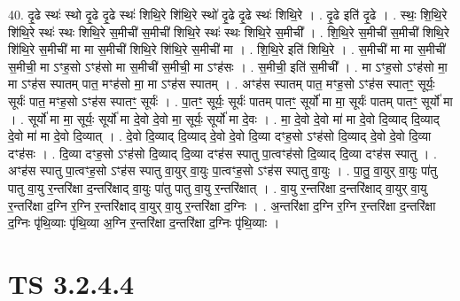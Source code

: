 \documentclass[17pt]{extarticle}
\begin{document}
40. दृ॒ढे स्थः॑ स्थो दृ॒ढे दृ॒ढे स्थः॑ शिथि॒रे शि॑थि॒रे स्थो॑ दृ॒ढे दृ॒ढे स्थः॑ शिथि॒रे । . दृ॒ढे इति॑ दृ॒ढे । . स्थः॒ शि॒थि॒रे शि॑थि॒रे स्थः॑ स्थः शिथि॒रे स॒मीची॑ स॒मीची॑ शिथि॒रे स्थः॑ स्थः शिथि॒रे स॒मीची᳚ । . शि॒थि॒रे स॒मीची॑ स॒मीची॑ शिथि॒रे शि॑थि॒रे स॒मीची॑ मा मा स॒मीची॑ शिथि॒रे शि॑थि॒रे स॒मीची॑ मा । . शि॒थि॒रे इति॑ शिथि॒रे । . स॒मीची॑ मा मा स॒मीची॑ स॒मीची॒ मा ऽꣳह॒सो ऽꣳह॑सो मा स॒मीची॑ स॒मीची॒ मा ऽꣳह॑सः । . स॒मीची॒ इति॑ स॒मीची᳚ । . मा ऽꣳह॒सो ऽꣳह॑सो मा॒ मा ऽꣳह॑स स्पातम् पात॒ मꣳह॑सो मा॒ मा ऽꣳह॑स स्पातम् । . अꣳह॑स स्पातम् पात॒ मꣳह॒सो ऽꣳह॑स स्पातꣳ॒॒ सूर्यः॒ सूर्यः॑ पात॒ मꣳह॒सो 
ऽꣳह॑स स्पातꣳ॒॒ सूर्यः॑ । . पा॒तꣳ॒॒ सूर्यः॒ सूर्यः॑ पातम् पातꣳ॒॒ सूर्यो॑ मा मा॒ सूर्यः॑ पातम् पातꣳ॒॒ सूर्यो॑ मा । . सूर्यो॑ मा मा॒ सूर्यः॒ सूर्यो॑ मा दे॒वो दे॒वो मा॒ सूर्यः॒ सूर्यो॑ मा दे॒वः । . मा॒ दे॒वो दे॒वो मा॑ मा दे॒वो दि॒व्याद् दि॒व्याद् दे॒वो मा॑ मा दे॒वो दि॒व्यात् । . दे॒वो दि॒व्याद् दि॒व्याद् दे॒वो दे॒वो दि॒व्या दꣳह॒सो ऽꣳह॑सो दि॒व्याद् दे॒वो दे॒वो दि॒व्या दꣳह॑सः । . दि॒व्या दꣳह॒सो ऽꣳह॑सो दि॒व्याद् दि॒व्या दꣳह॑स स्पातु पा॒त्वꣳह॑सो दि॒व्याद् दि॒व्या दꣳह॑स स्पातु । . अꣳह॑स स्पातु पा॒त्वꣳह॒सो ऽꣳह॑स स्पातु वा॒युर् वा॒युः पा॒त्वꣳह॒सो ऽꣳह॑स स्पातु वा॒युः । . पा॒तु॒ वा॒युर् वा॒युः पा॑तु पातु वा॒यु र॒न्तरि॑क्षा द॒न्तरि॑क्षाद् वा॒युः पा॑तु पातु वा॒यु र॒न्तरि॑क्षात् । . वा॒यु र॒न्तरि॑क्षा द॒न्तरि॑क्षाद् वा॒युर् वा॒यु र॒न्तरि॑क्षा द॒ग्नि र॒ग्नि र॒न्तरि॑क्षाद् वा॒युर् वा॒यु र॒न्तरि॑क्षा द॒ग्निः । . अ॒न्तरि॑क्षा द॒ग्नि र॒ग्नि र॒न्तरि॑क्षा द॒न्तरि॑क्षा द॒ग्निः पृ॑थि॒व्याः पृ॑थि॒व्या अ॒ग्नि र॒न्तरि॑क्षा द॒न्तरि॑क्षा द॒ग्निः पृ॑थि॒व्याः । \newline
\pagebreak
{}

\section{ TS 3.2.4.4 }
\end{document}
